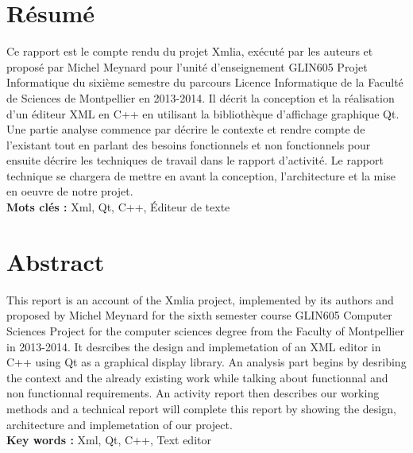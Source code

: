 \documentclass [a4 paper,11pt]{report}
\begin{document}
\section*{Résumé}
Ce rapport est le compte rendu du projet Xmlia, exécuté par les auteurs et proposé par Michel Meynard pour l’unité d’enseignement GLIN605 Projet Informatique du sixième semestre du parcours Licence Informatique de la Faculté de Sciences de Montpellier en 2013-2014. Il décrit la conception et la réalisation d'un éditeur XML en C++ en utilisant la bibliothèque d'affichage graphique Qt. Une partie analyse commence par décrire le contexte et rendre compte de l'existant tout en parlant des besoins fonctionnels et non fonctionnels pour ensuite décrire les techniques de travail dans le rapport d'activité. Le rapport technique se chargera de mettre en avant la conception, l'architecture et la mise en oeuvre de notre projet. \\

\textbf{Mots clés : } Xml, Qt, C++, Éditeur de texte

\section*{Abstract}
This report is an account of the Xmlia project, implemented by its authors and proposed by Michel Meynard for the sixth semester course GLIN605 Computer Sciences Project for the computer sciences degree from the Faculty of Montpellier in 2013-2014. It desrcibes the design and implemetation of an XML editor in C++ using Qt as a graphical display library. An analysis part begins by desribing the context and the already existing work while talking about functionnal and non functionnal requirements. An activity report then describes our working methods and a technical report will complete this report by showing the design, architecture and implemetation of our project. \\

\textbf{Key words : } Xml, Qt, C++, Text editor


\end{document}
